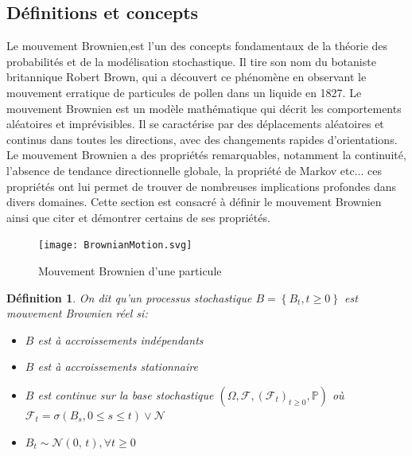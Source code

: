 \documentclass[A4paper,12pt]{report}
\newtheorem{definition}{D\'efinition}[chapter]
\newcommand{\pr}{{\mathbb{P}}}
\begin{document}
\subsection{Définitions et concepts}
Le mouvement Brownien,est l'un des concepts fondamentaux de la théorie des probabilités et de la modélisation stochastique. Il tire son nom du botaniste britannique Robert Brown, qui a découvert ce phénomène en observant le mouvement erratique de particules de pollen dans un liquide en 1827. Le mouvement Brownien est un modèle mathématique qui décrit les comportements aléatoires et imprévisibles. Il se caractérise par des déplacements aléatoires et continus dans toutes les directions, avec des changements rapides d'orientations.
Le mouvement Brownien a des propriétés remarquables, notamment la continuité, l'absence de tendance directionnelle globale, la propriété de Markov  etc... ces propriétés ont lui permet de trouver de nombreuses implications profondes dans divers domaines.
Cette section est consacré à définir le mouvement Brownien ainsi que citer et démontrer certains de ses propriétés.
\begin{figure}[h]
  \centering
  \texttt{[image: BrownianMotion.svg]}
  \caption{Mouvement Brownien d'une particule }
  \label{fig:mon_image}
\end{figure}
\begin{definition} 

On dit qu'un processus stochastique $B=\left\{B_{t}, t \geq 0\right\}$ est mouvement Brownien réel si:
\begin{itemize}
\item[•] $B$ est à accroissements indépendants
\item[•] $B$ est à accroissements  stationnaire
\item[•] $B$ est continue sur la base stochastique $\left(\Omega, \mathcal{F},\left(\mathcal{F}_{t}\right)_{t \geq 0}, \pr \right)$ où $\mathcal{F}_{t}=\sigma\left(B_{s}, 0 \leq s \leq t\right) \vee \mathcal{N}$
\item[•] $B_t \sim \mathcal{N}(0,\,t), \forall t\geq0$
\end{itemize} 


\end{definition} 
\end{document}
